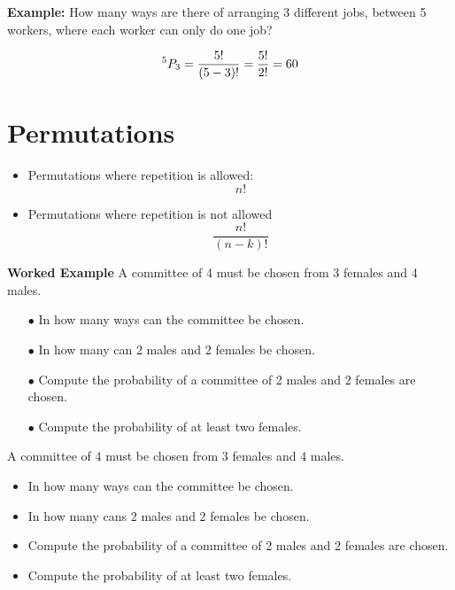 \documentclass[12pt]{report}
\begin{document}
{\Large
	\textbf{Example:}
	How many ways are there of arranging 3 different jobs, between 5 workers, where each worker can only do one job?
	
	
	\[ ^5 P_3 = \frac{5!}{(5-3)!}  = {5! \over 2!} = 60\]
	
}

\newpage
\section{Permutations}
\Large
\begin{itemize}
	\item Permutations where repetition is allowed: 
	\[ n! \]
	\item Permutations where repetition is not allowed
	\[ \frac{n!}{(n-k)!} \]
\end{itemize}

\newpage

\newpage
{\Large
\noindent \textbf{Worked Example}
A committee of 4 must be chosen from 3 females and 4 males.
	
	\begin{itemize}
		\item[$\bullet$] In how many ways can the committee be chosen.
		\item[$\bullet$] In how many can 2 males and 2 females be chosen.
		\item[$\bullet$]  Compute the probability of a committee of 2 males and 2 females are chosen.
		\item[$\bullet$] Compute the probability of at least two females.
	\end{itemize}
\bigskip
}


		
		A committee of 4 must be chosen from 3 females and 4 males.
		
		\begin{itemize}
			\item In how many ways can the committee be chosen.
			\item In how many cans 2 males and 2 females be chosen.
			\item Compute the probability of a committee of 2 males and 2 females are chosen.
			\item Compute the probability of at least two females.
		\end{itemize}
\end{document}
